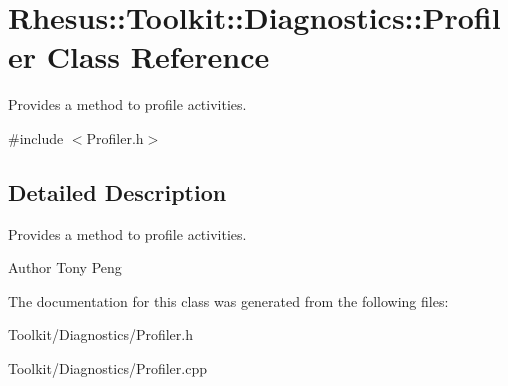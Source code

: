 \hypertarget{class_rhesus_1_1_toolkit_1_1_diagnostics_1_1_profiler}{\section{Rhesus\-:\-:Toolkit\-:\-:Diagnostics\-:\-:Profiler Class Reference}
\label{class_rhesus_1_1_toolkit_1_1_diagnostics_1_1_profiler}
}


Provides a method to profile activities.  




{\ttfamily \#include $<$Profiler.\-h$>$}



\subsection{Detailed Description}
Provides a method to profile activities. 

\begin{DoxyAuthor}{Author}
Tony Peng 
\end{DoxyAuthor}


The documentation for this class was generated from the following files\-:\begin{DoxyCompactItemize}
\item 
Toolkit/\-Diagnostics/Profiler.\-h\item 
Toolkit/\-Diagnostics/Profiler.\-cpp\end{DoxyCompactItemize}
